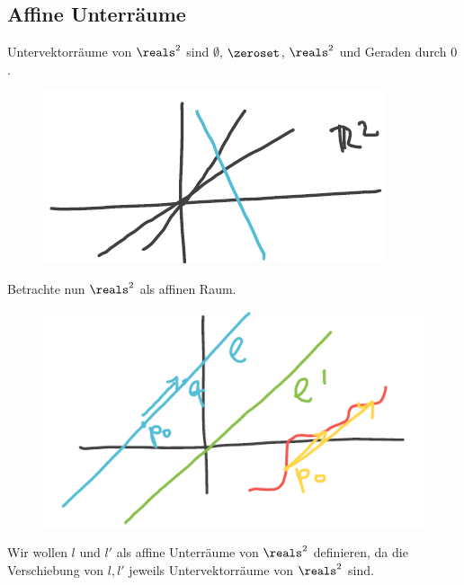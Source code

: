 \subsection*{Affine Unterräume}
\begin{beispiel*}
    Untervektorräume von \( \reals^2 \) sind \( \emptyset \), \( \zeroset \), \( \reals^2 \) und Geraden durch \( 0 \).
    \begin{figure}[H]
        \centering
        \includegraphics[width=0.4\linewidth]{figures/untervektorraeume_r2}
        \label{fig:untervektorraeume_r2}
    \end{figure}
    Betrachte nun \( \reals^2 \) als affinen Raum.
    \begin{figure}[H]
        \centering
        \includegraphics[width=0.5\linewidth]{figures/affine_unterraeume_r2}
        \label{fig:affine_unterraeume_r2}
    \end{figure}
    \begin{idee*}
        Wir wollen \( l \) und \( l' \) als affine Unterräume von \( \reals^2 \) definieren, da die Verschiebung von \( l, l' \) jeweils Untervektorräume von \( \reals^2 \) sind.
    \end{idee*}
\end{beispiel*}


